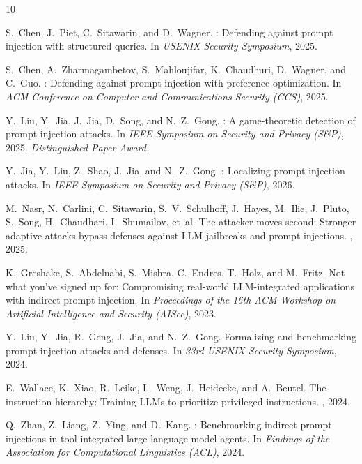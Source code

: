 \documentclass[letterpaper,twocolumn,10pt]{article}
\begin{document}


\begin{thebibliography}{10}

S.~Chen, J.~Piet, C.~Sitawarin, and D.~Wagner.
: Defending against prompt injection with structured queries.
\newblock In {\em USENIX Security Symposium}, 2025.

S.~Chen, A.~Zharmagambetov, S.~Mahloujifar, K.~Chaudhuri, D.~Wagner, and C.~Guo.
: Defending against prompt injection with preference optimization.
\newblock In {\em ACM Conference on Computer and Communications Security (CCS)}, 2025.

Y.~Liu, Y.~Jia, J.~Jia, D.~Song, and N.~Z.~Gong.
: A game-theoretic detection of prompt injection attacks.
\newblock In {\em IEEE Symposium on Security and Privacy (S\&P)}, 2025.
\newblock \textit{Distinguished Paper Award.}

Y.~Jia, Y.~Liu, Z.~Shao, J.~Jia, and N.~Z.~Gong.
: Localizing prompt injection attacks.
\newblock In {\em IEEE Symposium on Security and Privacy (S\&P)}, 2026.

M.~Nasr, N.~Carlini, C.~Sitawarin, S.~V.~Schulhoff, J.~Hayes, M.~Ilie, J.~Pluto, S.~Song, H.~Chaudhari, I.~Shumailov, et~al.
\newblock The attacker moves second: Stronger adaptive attacks bypass defenses against {LLM} jailbreaks and prompt injections.
, 2025.

K.~Greshake, S.~Abdelnabi, S.~Mishra, C.~Endres, T.~Holz, and M.~Fritz.
\newblock Not what you've signed up for: Compromising real-world {LLM}-integrated applications with indirect prompt injection.
\newblock In {\em Proceedings of the 16th ACM Workshop on Artificial Intelligence and Security (AISec)}, 2023.

Y.~Liu, Y.~Jia, R.~Geng, J.~Jia, and N.~Z.~Gong.
\newblock Formalizing and benchmarking prompt injection attacks and defenses.
\newblock In {\em 33rd USENIX Security Symposium}, 2024.

E.~Wallace, K.~Xiao, R.~Leike, L.~Weng, J.~Heidecke, and A.~Beutel.
\newblock The instruction hierarchy: Training {LLMs} to prioritize privileged instructions.
, 2024.

Q.~Zhan, Z.~Liang, Z.~Ying, and D.~Kang.
: Benchmarking indirect prompt injections in tool-integrated large language model agents.
\newblock In {\em Findings of the Association for Computational Linguistics (ACL)}, 2024.

\end{thebibliography}
\end{document}
